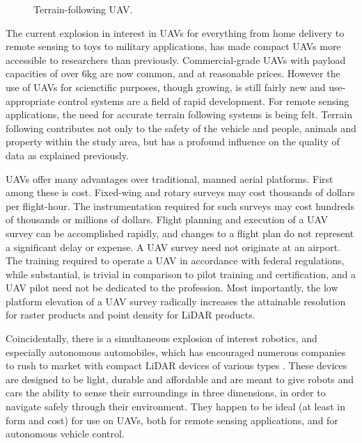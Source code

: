 \documentclass[10pt,a4paper]{report}
\begin{document}
\begin{figure}
\centering
\def\svgscale{0.5}

\caption{Terrain-following UAV.}
\label{fig:uav_terrain}
\end{figure}

The current explosion in interest in UAVs for everything from home delivery to remote sensing to toys to military applications, has made compact UAVs more accessible to researchers than previously. Commercial-grade UAVs with payload capacities of over 6kg are now common, and at reasonable prices. However the use of UAVs for scienctific purposes, though growing, is still fairly new and use-appropriate control systems are a field of rapid development. For remote sensing applications, the need for accurate terrain following systems is being felt. Terrain following contributes not only to the safety of the vehicle and people, animals and property within the study area, but has a profound influence on the quality of data as explained previously. 

UAVs offer many advantages over traditional, manned aerial platforms. First among these is cost. Fixed-wing and rotary surveys may cost thousands of dollars per flight-hour. The instrumentation required for such surveys may cost hundreds of thousands or millions  of dollars. Flight planning and execution of a UAV survey can be accomplished rapidly, and changes to a flight plan do not represent a significant delay or expense. A UAV survey need not originate at an airport. The training required to operate a UAV in accordance with federal regulations, while substantial, is trivial in comparison to pilot training and certification, and a UAV pilot need not be dedicated to the profession. Most importantly, the low platform elevation of a UAV survey radically increases the attainable resolution for raster products and point density for LiDAR products.

Coincidentally, there is a simultaneous explosion of interest robotics, and especially autonomous automobiles, which has encouraged numerous companies to rush to market with compact LiDAR devices of various types \cite{Quanergy2017,Dormehl2017,Morin2017}. These devices are designed to be light, durable and affordable and are meant to give robots and cars the ability to sense their surroundings in three dimensions, in order to navigate safely through their environment. They happen to be ideal (at least in form and cost) for use on UAVs, both for remote sensing applications, and for autonomous vehicle control.
\end{document}
